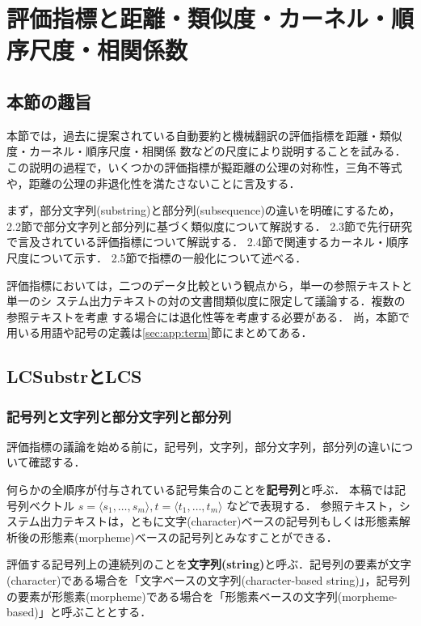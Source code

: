 \documentclass[japanese]{jnlp_1.4}
\begin{document}
\section{評価指標と距離・類似度・カーネル・順序尺度・相関係数}
\label{sec:sim}

\subsection{本節の趣旨}
\label{ss:sim-intro}

本節では，過去に提案されている自動要約と機械翻訳の評価指標を距離・類似度・カーネル・順序尺度・相関係
数などの尺度により説明することを試みる．この説明の過程で，いくつかの評価指標が擬距離の公理の対称性，三角不等式や，距離の公理の非退化性を満たさないことに言及する．

まず，部分文字列(substring)と部分列(subsequence)の違いを明確にするため，
2.2節で部分文字列と部分列に基づく類似度について解説する．
2.3節で先行研究で言及されている評価指標について解説する．
2.4節で関連するカーネル・順序尺度について示す．
2.5節で指標の一般化について述べる．

評価指標においては，二つのデータ比較という観点から，単一の参照テキストと単一のシ
ステム出力テキストの対の文書間類似度に限定して議論する．複数の参照テキストを考慮
する場合には退化性等を考慮する必要がある．
尚，本節で用いる用語や記号の定義は\ref{sec:app:term}節にまとめてある．


\subsection{LCSubstrとLCS}

\subsubsection{記号列と文字列と部分文字列と部分列}

評価指標の議論を始める前に，記号列，文字列，部分文字列，部分列の違いについて確認する．

何らかの全順序が付与されている記号集合のことを{\bf 記号列}と呼ぶ．
本稿では記号列ベクトル $s = \langle s_{1}, \ldots, s_{m} \rangle, t = \langle t_{1}, \ldots, t_{m} \rangle$ などで表現する．
参照テキスト，システム出力テキストは，ともに文字(character)ベースの記号列もしくは形態素解析後の形態素(morpheme)ベースの記号列とみなすことができる．

評価する記号列上の連続列のことを{\bf 文字列(string)}と呼ぶ．記号列の要素が文字(character)である場合を「文字ベースの文字列(character-based string)」，記号列の要素が形態素(morpheme)である場合を「形態素ベースの文字列(morpheme-based)」と呼ぶこととする．
\end{document}
